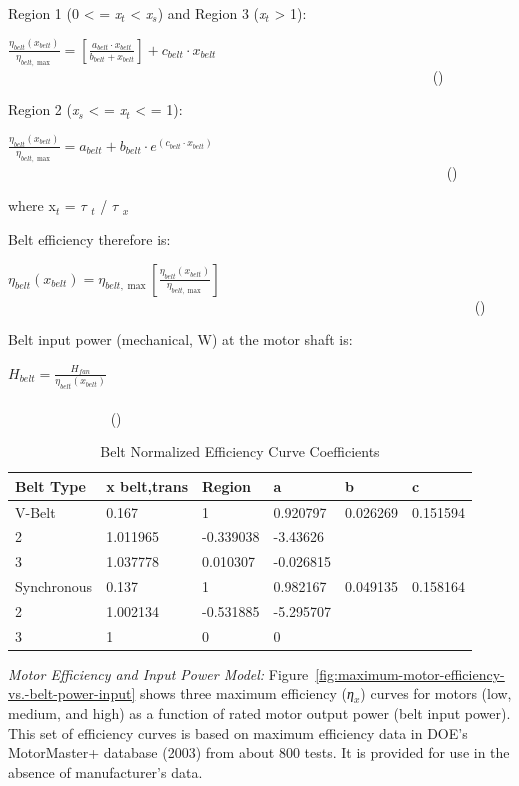 Region 1 (0 \textless{} = \emph{x\(_{t}\)} \textless{} \emph{x\(_{s}\)}) and Region 3 (\emph{x\(_{t}\)} \textgreater{} 1):

\(\frac{{{\eta_{belt}}({x_{belt}})}}{{{\eta_{belt,\max }}}} = \left[ {\frac{{{a_{belt}} \cdot {x_{belt}}}}{{{b_{belt}} + {x_{belt}}}}} \right] + {c_{belt}} \cdot {x_{belt}}\) ~~~~~~~~~~~~~~~~~~~~~~~~~~~~~~~~~~~~~~~~~~~~~~~~~~~~~~~~~~~~ ()

Region 2 (\emph{x\(_{s}\)} \textless{} = \emph{x\(_{t}\)} \textless{} = 1):

\(\frac{{{\eta_{belt}}({x_{belt}})}}{{{\eta_{belt,\max }}}} = {a_{belt}} + {b_{belt}} \cdot {e^{\left( {{c_{belt}} \cdot {x_{belt}}} \right)}}\) ~~~~~~~~~~~~~~~~~~~~~~~~~~~~~~~~~~~~~~~~~~~~~~~~~~~~~~~~~~~~~~ ()

where x\(_{t}\) = \(\tau\) \(_{t}\) / \(\tau\) \(_{x}\)

Belt efficiency therefore is:

\({\eta_{belt}}({x_{belt}}) = {\eta_{belt,\max }}\left[ {\frac{{{\eta_{belt}}({x_{belt}})}}{{{\eta_{belt,\max }}}}} \right]\) ~~~~~~~~~~~~~~~~~~~~~~~~~~~~~~~~~~~~~~~~~~~~~~~~~~~~~~~~~~~~~~~~~~ ()

Belt input power (mechanical, W) at the motor shaft is:

\({H_{belt}} = \frac{{{H_{fan}}}}{{{\eta_{belt}}({x_{belt}})}}\) ~~~~~~~~~~~~~~~~~~~~~~~~~~~~~~~~~~~~~~~~~~~~~~~~~~~~~~~~~~~~~~~~~~~~~~~~~~~~~~~~~~~~~~ ()

\begin{longtable}[c]{@{}llllll@{}}
\caption{Belt Normalized Efficiency Curve Coefficients \protect \label{table:belt-normalized-efficiency-curve-coefficients}}\\
\toprule 
Belt Type & x belt,trans & Region & a & b & c \tabularnewline \midrule
\endhead
V-Belt & 0.167 & 1 & 0.920797 & 0.026269 & 0.151594 \tabularnewline
2 & 1.011965 & -0.339038 & -3.43626 \tabularnewline
3 & 1.037778 & 0.010307 & -0.026815 \tabularnewline
Synchronous & 0.137 & 1 & 0.982167 & 0.049135 & 0.158164 \tabularnewline
2 & 1.002134 & -0.531885 & -5.295707 \tabularnewline
3 & 1 & 0 & 0 \tabularnewline
\bottomrule
\end{longtable}

\emph{Motor Efficiency and Input Power Model:} Figure~\ref{fig:maximum-motor-efficiency-vs.-belt-power-input} shows three maximum efficiency (\emph{η\(_{x}\)}) curves for motors (low, medium, and high) as a function of rated motor output power (belt input power). This set of efficiency curves is based on maximum efficiency data in DOE's MotorMaster+ database (2003) from about 800 tests. It is provided for use in the absence of manufacturer's data.


